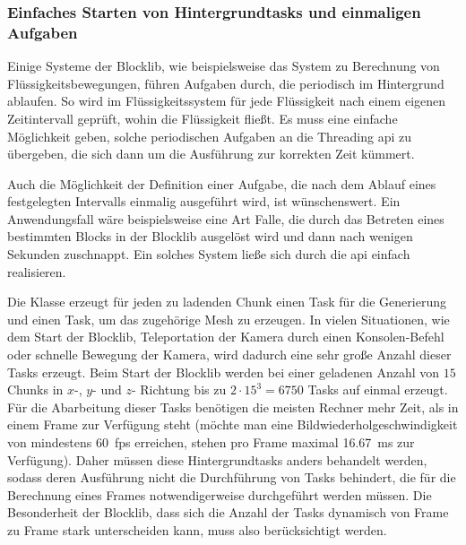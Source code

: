 \subsubsection{Einfaches Starten von Hintergrundtasks und einmaligen Aufgaben}\label{sec:reqBackgroundTasks}
Einige Systeme der Blocklib, wie beispielsweise das System zu Berechnung von Flüssigkeitsbewegungen, führen Aufgaben durch, die periodisch im Hintergrund ablaufen. So wird im Flüssigkeitssystem für jede Flüssigkeit nach einem eigenen Zeitintervall geprüft, wohin die Flüssigkeit fließt. Es muss eine einfache Möglichkeit geben, solche periodischen Aufgaben an die Threading \acs{api} zu übergeben, die sich dann um die Ausführung zur korrekten Zeit kümmert.

Auch die Möglichkeit der Definition einer Aufgabe, die nach dem Ablauf eines festgelegten Intervalls einmalig ausgeführt wird, ist wünschenswert. Ein Anwendungsfall wäre beispielsweise eine Art Falle, die durch das Betreten eines bestimmten Blocks in der Blocklib ausgelöst wird und dann nach wenigen Sekunden zuschnappt. Ein solches System ließe sich durch die \acs{api} einfach realisieren.

Die Klasse \classChunkStorage{} erzeugt für jeden zu ladenden Chunk einen Task für die Generierung und einen Task, um das zugehörige Mesh zu erzeugen. In vielen Situationen, wie dem Start der Blocklib, Teleportation der Kamera durch einen Konsolen-Befehl oder schnelle Bewegung der Kamera, wird dadurch eine sehr große Anzahl dieser Tasks erzeugt. Beim Start der Blocklib werden bei einer geladenen Anzahl von $15$ Chunks in  $x$-, $y$- und $z$- Richtung bis zu $2\cdot15^3=6750$  Tasks auf einmal erzeugt. Für die Abarbeitung dieser Tasks benötigen die meisten Rechner mehr Zeit, als in einem Frame zur Verfügung steht (möchte man eine Bildwiederholgeschwindigkeit von mindestens 60~\ac{fps} erreichen, stehen pro Frame maximal \SI{16,67}{\milli\second} zur Verfügung). Daher müssen diese Hintergrundtasks anders behandelt werden, sodass deren Ausführung nicht die Durchführung von Tasks behindert, die für die Berechnung eines Frames notwendigerweise durchgeführt werden müssen. Die Besonderheit der Blocklib, dass sich die Anzahl der Tasks  dynamisch von Frame zu Frame stark unterscheiden kann, muss also berücksichtigt werden.